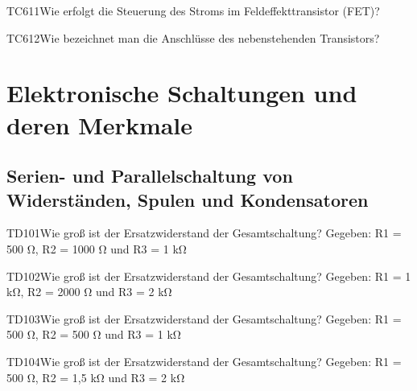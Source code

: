 \begin{question}{TC611}{Wie erfolgt die Steuerung des Stroms im Feldeffekttransistor (FET)?}
\end{question}

\begin{question}{TC612}{Wie bezeichnet man die Anschlüsse des nebenstehenden Transistors?}
\end{question}

\section{Elektronische Schaltungen und deren Merkmale}

\subsection{Serien- und Parallelschaltung von Widerständen, Spulen und Kondensatoren}

\begin{question}{TD101}{Wie groß ist der Ersatzwiderstand der Gesamtschaltung? Gegeben: R1 = 500 Ω,  R2 = 1000 Ω und R3 = 1 kΩ}
\end{question}

\begin{question}{TD102}{Wie groß ist der Ersatzwiderstand der Gesamtschaltung? Gegeben: R1 = 1 kΩ,  R2 = 2000 Ω und R3 = 2 kΩ}
\end{question}

\begin{question}{TD103}{Wie groß ist der Ersatzwiderstand der Gesamtschaltung? Gegeben: R1 = 500 Ω,  R2 = 500 Ω und R3 = 1 kΩ}
\end{question}

\begin{question}{TD104}{Wie groß ist der Ersatzwiderstand der Gesamtschaltung? Gegeben: R1 = 500 Ω,  R2 = 1,5 kΩ und R3 = 2 kΩ}
\end{question}

